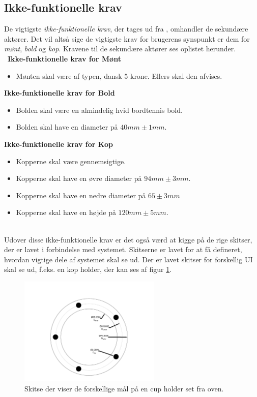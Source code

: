 \documentclass[Rapport/Rapport_main.tex]{subfiles}
\begin{document}
\subsection{Ikke-funktionelle krav}
De vigtigste \textit{ikke-funktionelle krav}, der tages ud fra , omhandler de sekundære aktører. Det vil altså sige de vigtigste krav for brugerens synspunkt er dem for \textit{mønt}, \textit{bold} og \textit{kop}. Kravene til de sekundære aktører ses oplistet herunder. \\\
\textbf{Ikke-funktionelle krav for Mønt}
\begin{itemize}
    \item Mønten skal være af typen, dansk 5 krone. Ellers skal den afvises.
\end{itemize}
\textbf{Ikke-funktionelle krav for Bold}
\begin{itemize}
    \item Bolden skal være en almindelig hvid bordtennis bold.
    \item Bolden skal have en diameter på $40mm \pm{1mm}$.
\end{itemize}
\textbf{Ikke-funktionelle krav for Kop} 
\begin{itemize}
    \item Kopperne skal være gennemsigtige.
    \item Kopperne skal have en øvre diameter på $94mm \pm{3mm}$.
    \item Kopperne skal have en nedre diameter på $65 \pm{3mm}$
    \item Kopperne skal have en højde på $120mm \pm{5mm}$.
\end{itemize}\\
Udover disse ikke-funktionelle krav er det også værd at kigge på de rige skitser, der er lavet i forbindelse med systemet. Skitserne er lavet for at få defineret, hvordan vigtige dele af systemet skal se ud. Der er lavet skitser for forskellig UI skal se ud, f.eks. en kop holder, der kan ses af figur \ref{fig:rap_LEDplacement}.
\begin{figure}[H]
    \centering
    \includegraphics[width=0.6\textwidth,trim={2in 0.4in 2in 1.3in},clip, page=1]{Kravspecifikation/Ikke-funktionelle/graphics/LEDplacement.pdf}
    \caption{Skitse der viser de forskellige mål på en cup holder set fra oven.}
    \label{fig:rap_LEDplacement}
\end{figure}
\end{document}
